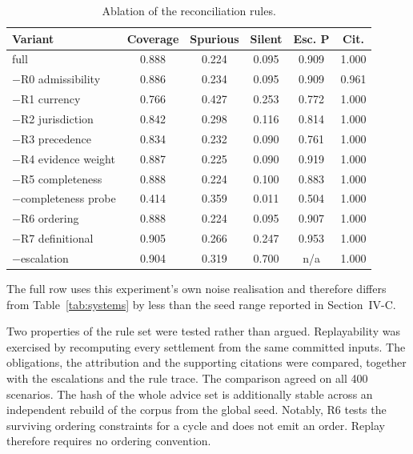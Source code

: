 \documentclass[journal]{IEEEtran}
\begin{document}
\begin{table}[!t]
\centering
\caption{Ablation of the reconciliation rules.}
\label{tab:ablation}
\footnotesize
\begin{tabular}{@{}lccccc@{}}
\toprule
Variant & Coverage & Spurious & Silent & Esc. P & Cit. \\
\midrule
full                       & 0.888 & 0.224 & 0.095 & 0.909 & 1.000 \\
$-$R0 admissibility        & 0.886 & 0.234 & 0.095 & 0.909 & 0.961 \\
$-$R1 currency             & 0.766 & 0.427 & 0.253 & 0.772 & 1.000 \\
$-$R2 jurisdiction         & 0.842 & 0.298 & 0.116 & 0.814 & 1.000 \\
$-$R3 precedence           & 0.834 & 0.232 & 0.090 & 0.761 & 1.000 \\
$-$R4 evidence weight      & 0.887 & 0.225 & 0.090 & 0.919 & 1.000 \\
$-$R5 completeness         & 0.888 & 0.224 & 0.100 & 0.883 & 1.000 \\
$-$completeness probe      & 0.414 & 0.359 & 0.011 & 0.504 & 1.000 \\
$-$R6 ordering             & 0.888 & 0.224 & 0.095 & 0.907 & 1.000 \\
$-$R7 definitional         & 0.905 & 0.266 & 0.247 & 0.953 & 1.000 \\
$-$escalation              & 0.904 & 0.319 & 0.700 & n/a   & 1.000 \\
\bottomrule
\end{tabular}

\vspace{2pt}
\footnotesize\raggedright
The full row uses this experiment's own noise realisation and therefore differs from Table~\ref{tab:systems} by less than the seed range reported in Section~IV-C.
\end{table}

Two properties of the rule set were tested rather than argued. Replayability was exercised by recomputing every settlement from the same committed inputs. The obligations, the attribution and the supporting citations were compared, together with the escalations and the rule trace. The comparison agreed on all 400 scenarios. The hash of the whole advice set is additionally stable across an independent rebuild of the corpus from the global seed. Notably, R6 tests the surviving ordering constraints for a cycle and does not emit an order. Replay therefore requires no ordering convention.
\end{document}
